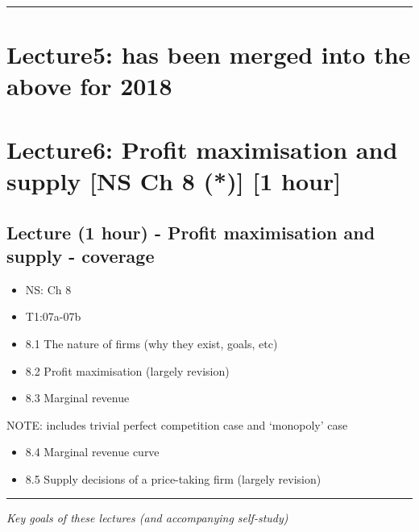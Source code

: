 \documentclass[]{article}
\providecommand{\tightlist}{%
  \setlength{\itemsep}{0pt}\setlength{\parskip}{0pt}}
\begin{document}
\begin{center}\rule{0.5\linewidth}{\linethickness}\end{center}

\hypertarget{lecture5-has-been-merged-into-the-above-for-2018}{%
\section{Lecture5: has been merged into the above for
2018}\label{lecture5-has-been-merged-into-the-above-for-2018}}

\hypertarget{lecture6-profit-maximisation-and-supply-ns-ch-8-1-hour}{%
\section{Lecture6: Profit maximisation and supply {[}NS Ch 8 (*){]} {[}1
hour{]}}\label{lecture6-profit-maximisation-and-supply-ns-ch-8-1-hour}}

\hypertarget{lecture-1-hour---profit-maximisation-and-supply---coverage}{%
\subsection{Lecture (1 hour) - Profit maximisation and supply -
coverage}\label{lecture-1-hour---profit-maximisation-and-supply---coverage}}

\begin{itemize}
\item
  NS: Ch 8
\item
  T1:07a-07b
\item
  8.1 The nature of firms (why they exist, goals, etc)
\item
  8.2 Profit maximisation (largely revision)
\item
  8.3 Marginal revenue
\end{itemize}

NOTE: includes trivial perfect competition case and `monopoly' case

\begin{itemize}
\tightlist
\item
  8.4 Marginal revenue curve
\item
  8.5 Supply decisions of a price-taking firm (largely revision)
\end{itemize}

\begin{center}\rule{0.5\linewidth}{\linethickness}\end{center}

\emph{Key goals of these lectures (and accompanying self-study)}
\end{document}
